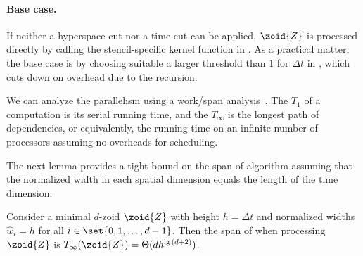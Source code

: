 \paragraph{Base case.}
If neither a hyperspace cut nor a time cut can be applied, $\zoid{Z}$ is
processed directly by calling the stencil-specific kernel function in
.  As a practical matter, the base
case is  by choosing suitable a larger threshold than
$1$ for $\Delta t$ in , which cuts down on overhead
due to the recursion.


We can analyze the parallelism using a work/span
analysis~\cite[Ch.~27]{CormenLeRi+09}.  The  $T_1$ of a
computation is its serial running time, and the  $T_\infty$
is the longest path of dependencies, or equivalently, the running time
on an infinite number of processors assuming no overheads for
scheduling.

The next lemma provides a tight bound on the span of 
algorithm assuming that the normalized width in each spatial dimension
equals the length of the time dimension.
\begin{lemma}
  Consider a minimal $d$-zoid $\zoid{Z}$ with height $h=\Delta t$ and
  normalized widths $\widehat{w}_i = h$ for all $i \in
  \set{0,1,\ldots, d-1}$.  Then the span of  when
  processing $\zoid{Z}$ is $T_{\infty}(\zoid{Z}) = \Theta(dh^{\lg{(d +
      2)}})$.
\label{lem:HyperspaceCutSimpleCase}
\end{lemma}

